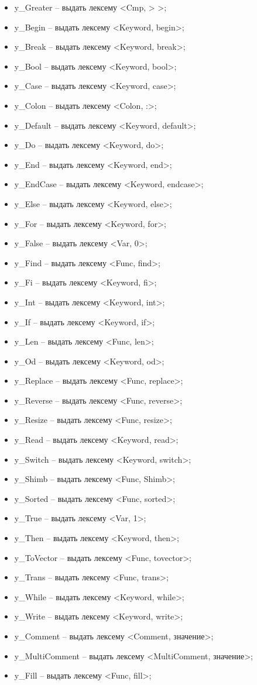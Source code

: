 \documentclass[a4paper,final]{article}
\begin{document}
\begin{itemize}
    \item y\_Greater -- выдать лексему <Cmp, > >;
    \item y\_Begin -- выдать лексему <Keyword, begin>;
    \item y\_Break -- выдать лексему <Keyword, break>;
    \item y\_Bool -- выдать лексему <Keyword, bool>;
    \item y\_Case -- выдать лексему <Keyword, case>;
    \item y\_Colon -- выдать лексему <Colon, :>;
    \item y\_Default -- выдать лексему <Keyword, default>;
    \item y\_Do -- выдать лексему <Keyword, do>;
    \item y\_End -- выдать лексему <Keyword, end>;
    \item y\_EndCase -- выдать лексему <Keyword, endcase>;
    \item y\_Else -- выдать лексему <Keyword, else>;
    \item y\_For -- выдать лексему <Keyword, for>;
    \item y\_False -- выдать лексему <Var, 0>;
    \item y\_Find -- выдать лексему <Func, find>;
    \item y\_Fi -- выдать лексему <Keyword, fi>;
    \item y\_Int -- выдать лексему <Keyword, int>;
    \item y\_If -- выдать лексему <Keyword, if>;
    \item y\_Len -- выдать лексему <Func, len>;
    \item y\_Od -- выдать лексему <Keyword, od>;
    \item y\_Replace -- выдать лексему <Func, replace>;
    \item y\_Reverse -- выдать лексему <Func, reverse>;
    \item y\_Resize -- выдать лексему <Func, resize>;
    \item y\_Read -- выдать лексему <Keyword, read>;
    \item y\_Switch -- выдать лексему <Keyword, switch>;
    \item y\_Shimb -- выдать лексему <Func, Shimb>;
    \item y\_Sorted -- выдать лексему <Func, sorted>;
    \item y\_True -- выдать лексему <Var, 1>;
    \item y\_Then -- выдать лексему <Keyword, then>;
    \item y\_ToVector -- выдать лексему <Func, tovector>;
    \item y\_Trans -- выдать лексему <Func, trans>;
    \item y\_While -- выдать лексему <Keyword, while>;
    \item y\_Write -- выдать лексему <Keyword, write>;
    \item y\_Comment -- выдать лексему <Comment, значение>;
    \item y\_MultiComment -- выдать лексему <MultiComment, значение>;
    \item y\_Fill -- выдать лексему <Func, fill>;
\end{itemize}
\end{document}
